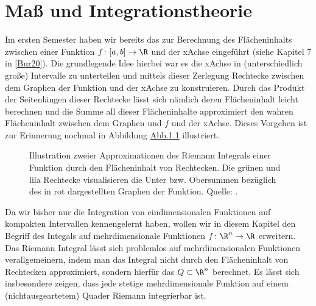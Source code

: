 \documentclass[letterpaper,10pt,german]{jupyterBook}
\let\sphinxpxdimen\pdfpxdimen\else\newdimen\sphinxpxdimen
\begin{document}
\chapter{Maß\sphinxhyphen{} und Integrationstheorie}
\label{\detokenize{masstheorie/intro_masstheorie:masz-und-integrationstheorie}}\label{\detokenize{masstheorie/intro_masstheorie::doc}}
\sphinxAtStartPar
Im ersten Semester haben wir bereits das  zur Berechnung des Flächeninhalts zwischen einer Funktion \(f \colon [a,b] \rightarrow \R\) und der x\sphinxhyphen{}Achse eingeführt (siehe Kapitel 7 in {[}\hyperlink{cite.references:id2}{Bur20}{]}).
Die grundlegende Idee hierbei war es die x\sphinxhyphen{}Achse in (unterschiedlich große) Intervalle zu unterteilen und mittels dieser Zerlegung Rechtecke zwischen dem Graphen der Funktion und der x\sphinxhyphen{}Achse zu konstruieren.
Durch das Produkt der Seitenlängen dieser Rechtecke lässt sich nämlich deren Flächeninhalt leicht berechnen und die Summe all dieser Flächeninhalte approximiert den wahren Flächeninhalt zwischen dem Graphen und \(f\) und der x\sphinxhyphen{}Achse.
Dieses Vorgehen ist zur Erinnerung nochmal in Abbildung \hyperref[\detokenize{masstheorie/intro_masstheorie:fig-riemann-integral}]{Abb.\@ \ref{\detokenize{masstheorie/intro_masstheorie:fig-riemann-integral}}} illustriert.

\begin{figure}[htbp]
\centering
\capstart

\noindent\sphinxincludegraphics[height=300\sphinxpxdimen]{{ober_untersummen}.png}
\caption{Illustration zweier Approximationen des Riemann Integrals einer Funktion durch den Flächeninhalt von Rechtecken. Die grünen und lila Rechtecke visualisieren die Unter\sphinxhyphen{} bzw. Obersummen bezüglich des in rot dargestellten Graphen der Funktion. Quelle: .}\label{\detokenize{masstheorie/intro_masstheorie:fig-riemann-integral}}\end{figure}

\sphinxAtStartPar
Da wir bisher nur die Integration von eindimensionalen Funktionen auf kompakten Intervallen kennengelernt haben, wollen wir in diesem Kapitel den Begriff des Integals auf mehrdimensionale Funktionen \(f \colon \R^n \rightarrow \R\) erweitern.
Das Riemann Integral lässt sich problemlos auf mehrdimensionalen Funktionen verallgemeinern, indem man das Integral nicht durch den Flächeninhalt von Rechtecken approximiert, sondern hierfür das  \(Q \subset \R^n\) berechnet.
Es lässt sich insbesondere zeigen, dass jede stetige mehrdimensionale Funktion auf einem (nicht\sphinxhyphen{}ausgeartetem) Quader Riemann integrierbar ist.
\end{document}
